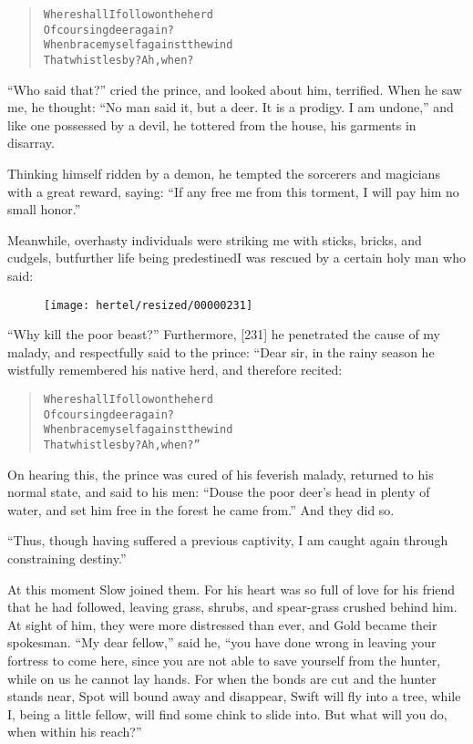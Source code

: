 \documentclass[article, twoside, 10pt]{memoir}
\renewenvironment{verbatim}{%
\begin{quote}%
\vskip -10pt%
\begin{alltt}\normalfont\small}{\end{alltt}%
\end{quote}%
\vskip -10pt
} %
\begin{document}
\begin{verbatim}
Where shall I follow on the herd
    Of coursing deer again?
When brace myself against the wind
    That whistles by? Ah, when?
\end{verbatim}
``Who said that?'' cried the prince, and looked about him,
terrified. When he saw me, he thought:
``No man said it, but a deer. It is a prodigy. I am undone,'' and
like one possessed by a devil, he tottered from the house, his
garments in disarray.

Thinking himself ridden by a demon, he tempted the sorcerers and
magicians with a great reward, saying:
``If any free me from this torment, I will pay him no small honor.''

Meanwhile, overhasty individuals were striking me with sticks,
bricks, and cudgels, but{\textemdash}further life being predestined{\textemdash}I was
rescued by a certain holy man who said:
\begin{figure}[p]\texttt{[image: hertel/resized/00000231]}\end{figure}``Why kill the poor beast?'' Furthermore, [231] he penetrated the
cause of my malady, and respectfully said to the prince: “Dear sir,
in the rainy season he wistfully remembered his native herd, and
therefore recited:

\begin{verbatim}
Where shall I follow on the herd
    Of coursing deer again?
When brace myself against the wind
    That whistles by? Ah, when?”
\end{verbatim}
On hearing this, the prince was cured of his feverish malady,
returned to his normal state, and said to his men:
``Douse the poor deer's head in plenty of water, and set him free in the forest he came from.''
And they did so.

``Thus, though having suffered a previous captivity, I am caught again through constraining destiny.''

At this moment Slow joined them. For his heart was so full of love
for his friend that he had followed, leaving grass, shrubs, and
spear-grass crushed behind him. At sight of him, they were more
distressed than ever, and Gold became their spokesman.
``My dear fellow,'' said he,
``you have done wrong in leaving your fortress to come here, since you are not able to save yourself from the hunter, while on us he cannot lay hands. For when the bonds are cut and the hunter stands near, Spot will bound away and disappear, Swift will fly into a tree, while I, being a little fellow, will find some chink to slide into. But what will you do, when within his reach?''
\end{document}
